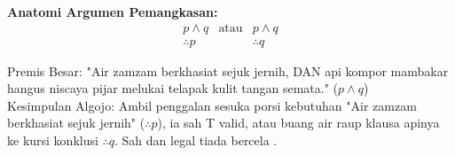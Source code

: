 \textbf{Anatomi Argumen Pemangkasan:}
\[
\begin{array}{ccc}
p \wedge q & \text{atau} & p \wedge q\\
\hline
\therefore p & & \therefore q
\end{array}
\]

\begin{contoh}
Premis Besar: "Air zamzam berkhasiat sejuk jernih, DAN api kompor mambakar hangus niscaya pijar melukai telapak kulit tangan semata." ($p \land q$) \\
Kesimpulan Algojo: Ambil penggalan sesuka porsi kebutuhan "Air zamzam berkhasiat sejuk jernih" ($\therefore p$), ia sah T valid, atau buang air raup klausa apinya ke kursi konklusi $\therefore q$. Sah dan legal tiada bercela \cite{rosen2019}.
\end{contoh}
